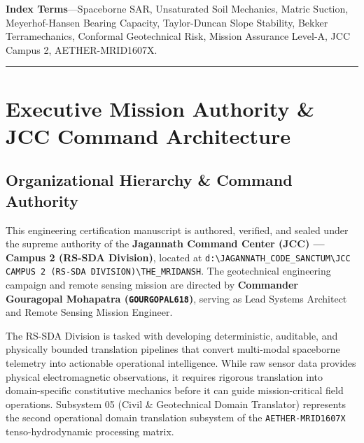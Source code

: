 \documentclass[11pt,a4paper]{article}
\theoremstyle{definition}
\theoremstyle{remark}
\begin{document}
\noindent \textbf{\small Index Terms}---Spaceborne SAR, Unsaturated Soil Mechanics, Matric Suction, Meyerhof-Hansen Bearing Capacity, Taylor-Duncan Slope Stability, Bekker Terramechanics, Conformal Geotechnical Risk, Mission Assurance Level-A, JCC Campus 2, AETHER-MRID1607X.

\vspace{0.4cm}
\hrule
\vspace{0.6cm}


\section{Executive Mission Authority \& JCC Command Architecture}

\subsection{Organizational Hierarchy \& Command Authority}
This engineering certification manuscript is authored, verified, and sealed under the supreme authority of the \textbf{Jagannath Command Center (JCC) --- Campus 2 (RS-SDA Division)}, located at \texttt{d:\textbackslash JAGANNATH\_CODE\_SANCTUM\textbackslash JCC CAMPUS 2 (RS-SDA DIVISION)\textbackslash THE\_MRIDANSH}. The geotechnical engineering campaign and remote sensing mission are directed by \textbf{Commander Gouragopal Mohapatra (\texttt{GOURGOPAL618})}, serving as Lead Systems Architect and Remote Sensing Mission Engineer.

The RS-SDA Division is tasked with developing deterministic, auditable, and physically bounded translation pipelines that convert multi-modal spaceborne telemetry into actionable operational intelligence. While raw sensor data provides physical electromagnetic observations, it requires rigorous translation into domain-specific constitutive mechanics before it can guide mission-critical field operations. Subsystem 05 (Civil \& Geotechnical Domain Translator) represents the second operational domain translation subsystem of the \texttt{AETHER-MRID1607X} tenso-hydrodynamic processing matrix.
\end{document}
